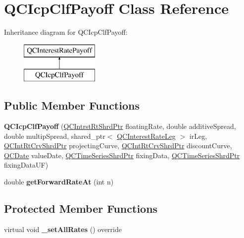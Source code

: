 \hypertarget{class_q_c_icp_clf_payoff}{\section{Q\+C\+Icp\+Clf\+Payoff Class Reference}
\label{class_q_c_icp_clf_payoff}
}
Inheritance diagram for Q\+C\+Icp\+Clf\+Payoff\+:\begin{figure}[H]
\begin{center}
\leavevmode
\includegraphics[height=2.000000cm]{class_q_c_icp_clf_payoff}
\end{center}
\end{figure}
\subsection*{Public Member Functions}
\begin{DoxyCompactItemize}
\item 
\hypertarget{class_q_c_icp_clf_payoff_a683899a85e390c596040712ac8692c46}{{\bfseries Q\+C\+Icp\+Clf\+Payoff} (\hyperlink{_q_c_definitions_8h_ae6a21ad26d19e482e3b01179cbc05298}{Q\+C\+Intrst\+Rt\+Shrd\+Ptr} floating\+Rate, double additive\+Spread, double multip\+Spread, shared\+\_\+ptr$<$ \hyperlink{class_q_c_interest_rate_leg}{Q\+C\+Interest\+Rate\+Leg} $>$ ir\+Leg, \hyperlink{_q_c_definitions_8h_a4b4fb466e49550e3dfd40003562cd19d}{Q\+C\+Int\+Rt\+Crv\+Shrd\+Ptr} projecting\+Curve, \hyperlink{_q_c_definitions_8h_a4b4fb466e49550e3dfd40003562cd19d}{Q\+C\+Int\+Rt\+Crv\+Shrd\+Ptr} discount\+Curve, \hyperlink{class_q_c_date}{Q\+C\+Date} value\+Date, \hyperlink{_q_c_definitions_8h_a6a601ffd693c05dd81309e3dca08b8f5}{Q\+C\+Time\+Series\+Shrd\+Ptr} fixing\+Data, \hyperlink{_q_c_definitions_8h_a6a601ffd693c05dd81309e3dca08b8f5}{Q\+C\+Time\+Series\+Shrd\+Ptr} fixing\+Data\+U\+F)}\label{class_q_c_icp_clf_payoff_a683899a85e390c596040712ac8692c46}

\item 
\hypertarget{class_q_c_icp_clf_payoff_a36aa6d8e71a0ef0357af1dd70b7b7d68}{double {\bfseries get\+Forward\+Rate\+At} (int n)}\label{class_q_c_icp_clf_payoff_a36aa6d8e71a0ef0357af1dd70b7b7d68}

\end{DoxyCompactItemize}
\subsection*{Protected Member Functions}
\begin{DoxyCompactItemize}
\item 
\hypertarget{class_q_c_icp_clf_payoff_af2a5eb4154c14eb2a1cb2d12e67d3744}{virtual void {\bfseries \+\_\+set\+All\+Rates} () override}\label{class_q_c_icp_clf_payoff_af2a5eb4154c14eb2a1cb2d12e67d3744}

\end{DoxyCompactItemize}
